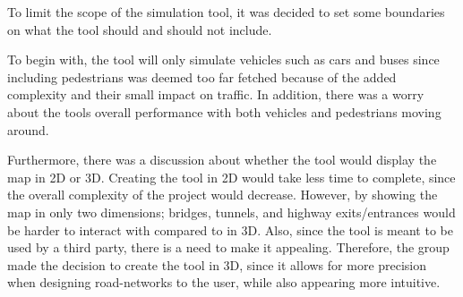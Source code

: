 
To limit the scope of the simulation tool, it was decided to set some boundaries on what the tool should and should not include. 

To begin with, the tool will only simulate vehicles such as cars and buses since including pedestrians was deemed too far fetched because of the added complexity and their small impact on traffic. In addition, there was a worry about the tools overall performance with both vehicles and pedestrians moving around.

Furthermore, there was a discussion about whether the tool would display the map in 2D or 3D. Creating the tool in 2D would take less time to complete, since the overall complexity of the project would decrease. However, by showing the map in only two dimensions; bridges, tunnels, and highway exits/entrances would be harder to interact with compared to in 3D. Also, since the tool is meant to be used by a third party, there is a need to make it appealing. Therefore, the group made the decision to create the tool in 3D, since it allows for more precision when designing road-networks to the user, while also appearing more intuitive.

